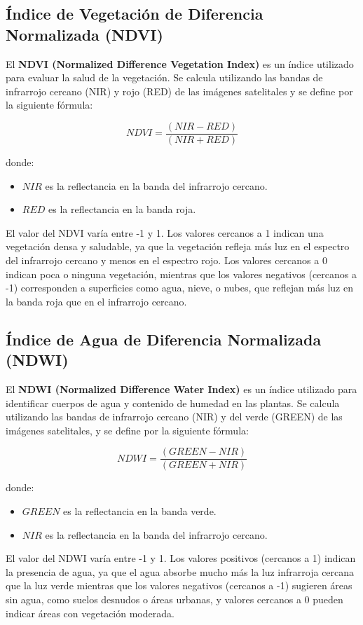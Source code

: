 \subsection{Índice de Vegetación de Diferencia Normalizada (NDVI)}

El \textbf{NDVI (Normalized Difference Vegetation Index)} es un índice utilizado para evaluar la salud de la vegetación. Se calcula utilizando las bandas de infrarrojo cercano (NIR) y rojo (RED) de las imágenes satelitales y se 
define por la siguiente fórmula:

\[
NDVI = \frac{(NIR - RED)}{(NIR + RED)}
\]

donde:
\begin{itemize}
    \item \(NIR\) es la reflectancia en la banda del infrarrojo cercano.
    \item \(RED\) es la reflectancia en la banda roja.
\end{itemize}

El valor del NDVI varía entre -1 y 1. Los valores cercanos a 1 indican una vegetación densa y saludable, ya que la vegetación refleja más luz en el espectro del infrarrojo cercano y menos en el espectro rojo. Los valores cercanos a 
0 indican poca o ninguna vegetación, mientras que los valores negativos (cercanos a -1) corresponden a superficies como agua, nieve, o nubes, que reflejan más luz en la banda roja que en el infrarrojo cercano.

\subsection{Índice de Agua de Diferencia Normalizada (NDWI)}
El \textbf{NDWI (Normalized Difference Water Index)} es un índice utilizado para identificar cuerpos de agua y contenido de humedad en las plantas. Se calcula utilizando las bandas de infrarrojo cercano (NIR) y del verde (GREEN) 
de las imágenes satelitales, y se define por la siguiente fórmula:

\[
NDWI = \frac{(GREEN - NIR)}{(GREEN + NIR)}
\]

donde:
\begin{itemize}
    \item \(GREEN\) es la reflectancia en la banda verde.
    \item \(NIR\) es la reflectancia en la banda del infrarrojo cercano.
\end{itemize}

El valor del NDWI varía entre -1 y 1. Los valores positivos (cercanos a 1) indican la presencia de agua, ya que el agua absorbe mucho más la luz infrarroja cercana que la luz verde mientras que los valores negativos (cercanos a -1) sugieren áreas 
sin agua, como suelos desnudos o áreas urbanas, y valores cercanos a 0 pueden indicar áreas con vegetación moderada.
